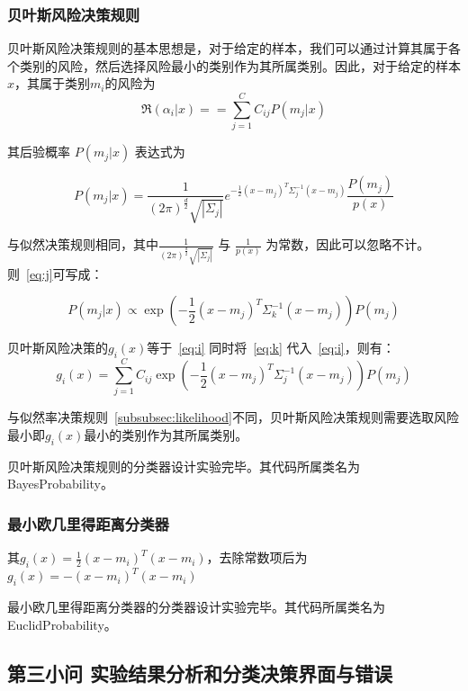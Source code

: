 \documentclass[UTF8]{article} %
\begin{document}
    \subsubsection{贝叶斯风险决策规则}
    贝叶斯风险决策规则的基本思想是，对于给定的样本，我们可以通过计算其属于各个类别的风险，然后选择风险最小的类别作为其所属类别。因此，对于给定的样本$x$，其属于类别$m_i$的风险为
    \begin{equation}
        \Re(\alpha_i|x) = = \sum_{j = 1}^{C} C_{ij} P(m_j|x) \label{eq:i}
    \end{equation}

    其后验概率 $P(m_j|x)$ 表达式为

    \begin{equation}
        P(m_j|x) = \frac{1}{(2\pi)^{\frac{d}{2}} \sqrt{|\Sigma_j|}}e^{-\frac{1}{2}(x-m_j)^T\Sigma_j^{-1}(x-m_j)}\frac{P(m_j)}{p(x)} \label{eq:j}
    \end{equation}

    与似然决策规则相同，其中$\frac{1}{(2\pi)^{\frac{d}{2}} \sqrt{|\Sigma_j|}}$ 与 $\frac{1}{p(x)}$ 为常数，因此可以忽略不计。则~\eqref {eq:j}可写成：

    \begin{equation}
        P(m_j|x) \propto \exp\left( -\frac{1}{2}(x-m_j)^T\Sigma_k^{-1}(x-m_j) \right) P(m_j) \label{eq:k}
    \end{equation}

    贝叶斯风险决策的$g_i(x)$等于~\eqref {eq:i} 同时将~\eqref {eq:k} 代入~\eqref {eq:i}，则有：
    \begin{equation}
        g_i(x) = \sum_{j = 1}^{C} C_{ij} \exp\left( -\frac{1}{2}(x-m_j)^T\Sigma_j^{-1}(x-m_j) \right) P(m_j) \label{eq:l}
    \end{equation}

    与似然率决策规则~\ref{subsubsec:likelihood}不同，贝叶斯风险决策规则需要选取风险最小即$g_i(x)$最小的类别作为其所属类别。

    贝叶斯风险决策规则的分类器设计实验完毕。其代码所属类名为 BayesProbability。

    \subsubsection{最小欧几里得距离分类器}
    其$g_i(x) = \frac{1}{2}(x-m_i)^T(x-m_i)$，去除常数项后为$g_i(x) =  -(x-m_i)^T(x-m_i)$

    最小欧几里得距离分类器的分类器设计实验完毕。其代码所属类名为 EuclidProbability。

    \subsection{第三小问 实验结果分析和分类决策界面与错误}
\end{document}
